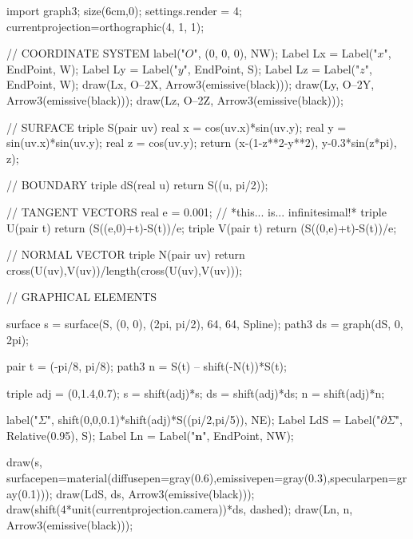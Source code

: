 \documentclass[]{beamer}
\begin{document}
import graph3;
size(6cm,0);
settings.render = 4;
currentprojection=orthographic(4, 1, 1);

// COORDINATE SYSTEM
label("$O$", (0, 0, 0), NW);
Label Lx = Label("$x$", EndPoint, W);
Label Ly = Label("$y$", EndPoint, S);
Label Lz = Label("$z$", EndPoint, W);
draw(Lx, O--2X, Arrow3(emissive(black)));
draw(Ly, O--2Y, Arrow3(emissive(black)));
draw(Lz, O--2Z, Arrow3(emissive(black)));

// SURFACE
triple S(pair uv) {
  real x = cos(uv.x)*sin(uv.y);
  real y = sin(uv.x)*sin(uv.y);
  real z =           cos(uv.y);
  return (x-(1-z**2-y**2), y-0.3*sin(z*pi), z);
}

// BOUNDARY
triple dS(real u) {
  return S((u, pi/2));
}

// TANGENT VECTORS
real e = 0.001; // *this... is... infinitesimal!*
triple U(pair t) { return (S((e,0)+t)-S(t))/e; }
triple V(pair t) { return (S((0,e)+t)-S(t))/e; }

// NORMAL VECTOR
triple N(pair uv) {
  return cross(U(uv),V(uv))/length(cross(U(uv),V(uv)));
}

// GRAPHICAL ELEMENTS

surface s = surface(S, (0, 0), (2pi, pi/2), 64, 64, Spline);
path3 ds = graph(dS, 0, 2pi);

pair t = (-pi/8, pi/8);
path3 n = S(t) -- shift(-N(t))*S(t);

triple adj = (0,1.4,0.7);
s = shift(adj)*s;
ds = shift(adj)*ds;
n = shift(adj)*n;

label("$\Sigma$", shift(0,0,0.1)*shift(adj)*S((pi/2,pi/5)), NE);
Label LdS = Label("$\partial\Sigma$", Relative(0.95), S);
Label Ln = Label("$\mathbf n$", EndPoint, NW);

draw(s, surfacepen=material(diffusepen=gray(0.6),emissivepen=gray(0.3),specularpen=gray(0.1)));
draw(LdS, ds, Arrow3(emissive(black)));
draw(shift(4*unit(currentprojection.camera))*ds, dashed);
draw(Ln, n, Arrow3(emissive(black)));
\end{document}
